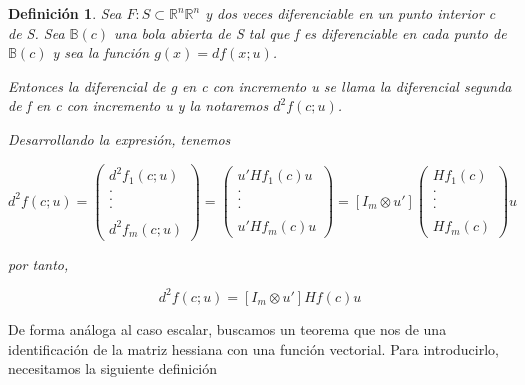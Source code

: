 \documentclass{article}
\theoremstyle{theorem-style}  %
\theoremstyle{definition-style}
\newtheorem{definition}{Definición}[section]
\theoremstyle{example-style}
\theoremstyle{exercise-style}
\begin{document}
	\begin{definition}
		Sea $F: S \subset \mathbb{R}^n \mathbb{R}^n$ y dos veces diferenciable en un punto interior c de S. Sea $\mathbb{B}(c)$ una bola abierta de S tal que f es diferenciable en cada punto de  $\mathbb{B}(c)$  y sea la función $g(x) = df(x;u)$. 
		
		Entonces la diferencial de g en c con incremento u se llama la diferencial segunda de f en c con incremento u y la notaremos $d^2 f(c;u)$.
		
		Desarrollando la expresión, tenemos
		
		$$d^2 f(c;u)= \left({\begin{array}{c}
			d^2 f_1(c;u)\\
			.\\
			.\\
			.\\
			\\
			d^2 f_m(c;u)
			\end{array} } \right) = \left({\begin{array}{c}
			u' H f_1(c) u\\
			.\\
			.\\
			.\\
			\\
			u' H f_m(c)u
			\end{array} } \right) = [I_m \otimes u'] \left({\begin{array}{c}
			H f_1(c)\\
			.\\
			.\\
			.\\
			\\
			H f_m(c)
			\end{array} } \right)u$$
		
		por tanto,
		
		$$d^2 f(c;u) = [I_m \otimes u'] H f(c) u$$
	\end{definition}
	
	De forma análoga al caso escalar, buscamos un teorema que nos de una identificación de la matriz hessiana con una función vectorial. Para introducirlo, necesitamos la siguiente definición
	
\end{document}
